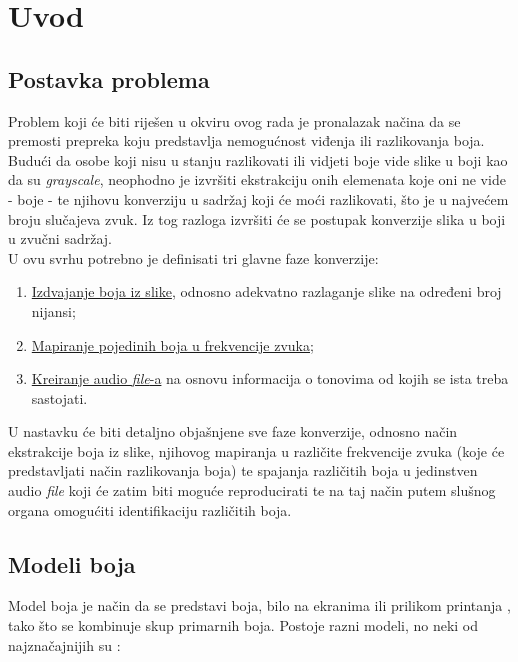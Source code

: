 \documentclass[12pt,a4paper]{article}
\begin{document}
\section{Uvod}

\subsection{Postavka problema}

Problem koji će biti riješen u okviru ovog rada je pronalazak načina da se premosti prepreka koju predstavlja nemogućnost viđenja ili razlikovanja boja. Budući da osobe koji nisu u stanju razlikovati ili vidjeti boje vide slike u boji kao da su \textit{grayscale}, neophodno je izvršiti ekstrakciju onih elemenata koje oni ne vide - boje - te njihovu konverziju u sadržaj koji će moći razlikovati, što je u najvećem broju slučajeva zvuk. Iz tog razloga izvršiti će se postupak konverzije slika u boji u zvučni sadržaj. \\

U ovu svrhu potrebno je definisati tri glavne faze konverzije:

\begin{enumerate}

\item \underline{Izdvajanje boja iz slike}, odnosno adekvatno razlaganje slike na određeni broj nijansi;
\item \underline{Mapiranje pojedinih boja u frekvencije zvuka};
\item \underline{Kreiranje audio \textit{file}-a} na osnovu informacija o tonovima od kojih se ista treba sastojati.

\end{enumerate}

U nastavku će biti detaljno objašnjene sve faze konverzije, odnosno način ekstrakcije boja iz slike, njihovog mapiranja u različite frekvencije zvuka (koje će predstavljati način razlikovanja boja) te spajanja različitih boja u jedinstven audio \textit{file} koji će zatim biti moguće reproducirati te na taj način putem slušnog organa omogućiti identifikaciju različitih boja.

\subsection{Modeli boja}

Model boja je način da se predstavi boja, bilo na ekranima ili prilikom printanja \cite{bels1}, tako što se kombinuje skup primarnih boja. Postoje razni modeli, no neki od najznačajnijih su \cite{bels2}:
\end{document}
